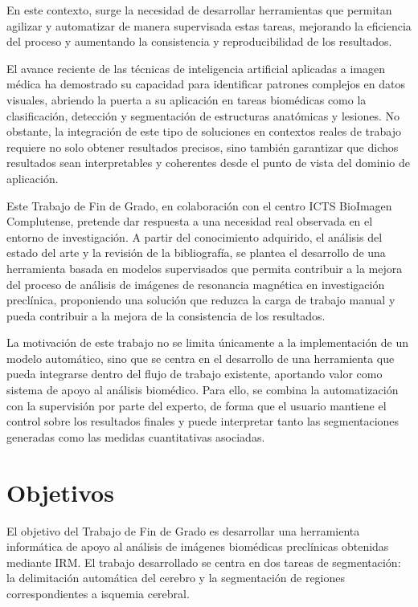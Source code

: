 En este contexto, surge la necesidad de desarrollar herramientas que permitan agilizar y automatizar de manera supervisada estas tareas, mejorando la eficiencia del proceso y aumentando la consistencia y reproducibilidad de los resultados.

El avance reciente de las técnicas de inteligencia artificial aplicadas a imagen médica ha demostrado su capacidad para identificar patrones complejos en datos visuales, abriendo la puerta a su aplicación en tareas biomédicas como la clasificación, detección y segmentación de estructuras anatómicas y lesiones. No obstante, la integración de este tipo de soluciones en contextos reales de trabajo requiere no solo obtener resultados precisos, sino también garantizar que dichos resultados sean interpretables y coherentes desde el punto de vista del dominio de aplicación. \citep{Akkus2017,litjens2017survey}

Este Trabajo de Fin de Grado, en colaboración con el centro ICTS BioImagen Complutense, pretende dar respuesta a una necesidad real observada en el entorno de investigación. A partir del conocimiento adquirido, el análisis del estado del arte y la revisión de la bibliografía, se plantea el desarrollo de una herramienta basada en modelos supervisados que permita contribuir a la mejora del proceso de análisis de imágenes de resonancia magnética en investigación preclínica, proponiendo una solución que reduzca la carga de trabajo manual y pueda contribuir a la mejora de la consistencia de los resultados.

La motivación de este trabajo no se limita únicamente a la implementación de un modelo automático, sino que se centra en el desarrollo de una herramienta que pueda integrarse dentro del flujo de trabajo existente, aportando valor como sistema de apoyo al análisis biomédico. Para ello, se combina la automatización con la supervisión por parte del experto, de forma que el usuario mantiene el control sobre los resultados finales y puede interpretar tanto las segmentaciones generadas como las medidas cuantitativas asociadas.

\section{Objetivos}

El objetivo del Trabajo de Fin de Grado es desarrollar una herramienta informática de apoyo al análisis de imágenes biomédicas preclínicas obtenidas mediante IRM. El trabajo desarrollado se centra en dos tareas de segmentación: la delimitación automática del cerebro y la segmentación de regiones correspondientes a isquemia cerebral.

